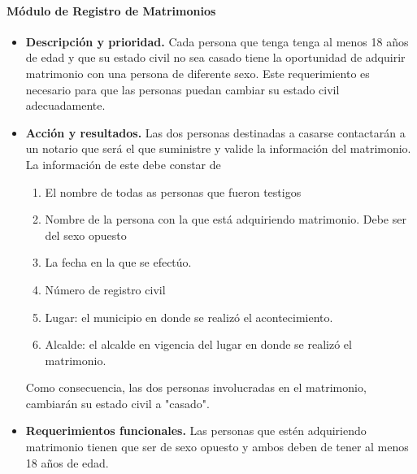 \paragraph{M\'{o}dulo de Registro de Matrimonios}
\begin{itemize}
\item \textbf{Descripci\'{o}n y prioridad.} Cada persona que tenga tenga al menos 18 a\~{n}os de edad y que su estado civil no sea casado tiene la oportunidad de adquirir matrimonio con una persona de diferente sexo. Este requerimiento es necesario para que las personas puedan cambiar su estado civil adecuadamente.

\item \textbf{Acci\'{o}n y resultados.} Las dos personas destinadas a casarse contactar\'{a}n a un notario que ser\'{a} el que suministre y valide la informaci\'{o}n del matrimonio. La informaci\'{o}n de este debe constar de
\begin{enumerate}
\item El nombre de todas as personas que fueron testigos
\item Nombre de la persona con la que est\'{a} adquiriendo matrimonio. Debe ser del sexo opuesto
\item La fecha en la que se efect\'{u}o.
\item N\'{u}mero de registro civil
\item Lugar: el municipio en donde se realiz\'{o} el acontecimiento.
\item Alcalde: el alcalde en vigencia del lugar en donde se realiz\'{o} el matrimonio.
\end{enumerate}
Como consecuencia, las dos personas involucradas en el matrimonio, cambiar\'{a}n su estado civil a "casado".

\item \textbf{Requerimientos funcionales.} Las personas que est\'{e}n adquiriendo matrimonio tienen que ser de sexo opuesto y ambos deben de tener al menos 18 a\~{n}os de edad.
\end{itemize}

